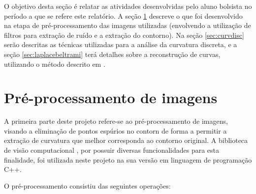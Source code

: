 O objetivo desta seção é relatar as atividades desenvolvidas pelo aluno bolsista no período a que se refere este relatório. A seção \ref{sec:preproc} descreve o que foi desenvolvido na etapa de pré-processamento das imagens utilizadas (envolvendo a utilização de filtros para extração de ruído e a extração do contorno). Na seção \ref{sec:curvdisc} serão descritas as técnicas utilizadas para a análise da curvatura discreta, e a seção \ref{sec:laplacebeltrami} terá detalhes sobre a reconstrução de curvas, utilizando o método descrito em .

\section{Pré-processamento de imagens}\label{sec:preproc}

A primeira parte deste projeto refere-se ao pré-processamento de imagens, visando a eliminação de pontos espúrios no contorn de forma a permitir a extração de curvatura que melhor corresponda ao contorno original. A biblioteca de visão computacional , por possuir diversas funcionalidades para esta finalidade, foi utilizada neste projeto na sua versão em linguagem de programação C++.

O pré-processamento consistiu das seguintes operações:

